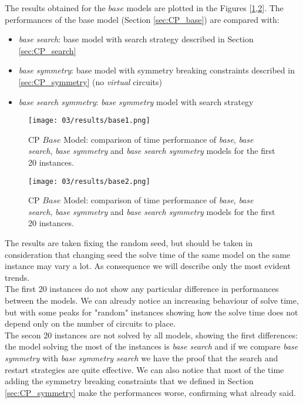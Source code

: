 The results obtained for the \(base\) models are plotted in the Figures [\ref{fig:CP_results_base1},\ref{fig:CP_results_base2}].
The performances of the base model (Section \ref{sec:CP_base}) are compared with:
\begin{itemize}
  \item \textit{base search}: base model with search strategy described in Section \ref{sec:CP_search}
  \item \textit{base symmetry}: base model with symmetry breaking constraints described in \ref{sec:CP_symmetry} (no \textit{virtual} circuits)
  \item \textit{base search symmetry}: \textit{base symmetry} model with search strategy
\end{itemize}

\begin{figure}[H]
  \centering
  \texttt{[image: 03/results/base1.png]}
  \caption{
    CP \(Base\) Model: comparison of time performance of \textit{base}, \textit{base search}, \textit{base symmetry} and \textit{base search symmetry} models
    for the first 20 instances.
  }
  \label{fig:CP_results_base1}
\end{figure}
\begin{figure}[H]
  \centering
  \texttt{[image: 03/results/base2.png]}
  \caption{
    CP \(Base\) Model: comparison of time performance of \textit{base}, \textit{base search}, \textit{base symmetry} and \textit{base search symmetry} models
    for the first 20 instances.
  }
  \label{fig:CP_results_base2}
\end{figure}

The results are taken fixing the random seed, but should be taken in consideration that changing seed
the solve time of the same model on the same instance may vary a lot. As consequence we will describe 
only the most evident trends.\\

The first 20 instances do not show any particular difference in performances between the models.
We can already notice an increasing behaviour of solve time, but with some peaks for "random" instances showing 
how the solve time does not depend only on the number of circuits to place. \\

The secon 20 instances are not solved by all models, showing the first differences: the model solving 
the most of the instances is \textit{base search} and if we compare \textit{base symmetry} with 
\textit{base symmetry search} we have the proof that the search and restart strategies are quite effective.
We can also notice that most of the time adding the symmetry breaking constraints that we defined in 
Section \ref{sec:CP_symmetry} make the performances worse, confirming what already said.\\


